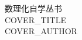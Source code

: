 \documentclass[UTF8,fontset=fandol,zihao=-4,oneside,openany]{ctexbook}
\begin{document}
\thispagestyle{empty}
\vspace*{0.18\textheight}
\begin{center}
{ 数理化自学丛书}\\[2.2cm]
{ COVER_TITLE}\\[2.2cm]
{ COVER_AUTHOR}
\end{center}
\end{document}
